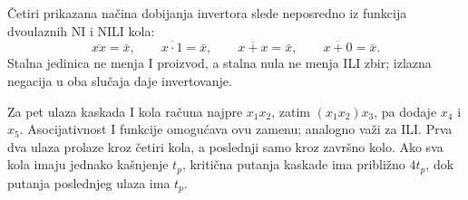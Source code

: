
Četiri prikazana načina dobijanja invertora slede neposredno iz funkcija dvoulaznih NI i NILI kola:
\[
\overline{xx}=\bar x,\qquad
\overline{x\cdot1}=\bar x,\qquad
\overline{x+x}=\bar x,\qquad
\overline{x+0}=\bar x.
\]
Stalna jedinica ne menja I proizvod, a stalna nula ne menja ILI zbir; izlazna negacija u oba slučaja daje invertovanje.

Za pet ulaza kaskada I kola računa najpre \(x_1x_2\), zatim \((x_1x_2)x_3\), pa dodaje \(x_4\) i \(x_5\). Asocijativnost I funkcije omogućava ovu zamenu; analogno važi za ILI. Prva dva ulaza prolaze kroz četiri kola, a poslednji samo kroz završno kolo. Ako sva kola imaju jednako kašnjenje \(t_p\), kritična putanja kaskade ima približno \(4t_p\), dok putanja poslednjeg ulaza ima \(t_p\).
